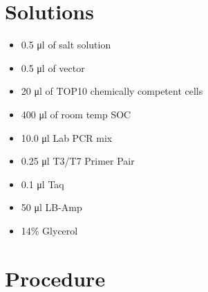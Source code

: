 \documentclass[
  letterpaper,
  DIV=11,
  numbers=noendperiod]{scrreprt}
\providecommand{\tightlist}{%
  \setlength{\itemsep}{0pt}\setlength{\parskip}{0pt}}\usepackage{longtable,booktabs,array}
\begin{document}
\hypertarget{solutions-21}{%
\section{Solutions}\label{solutions-21}}

\begin{itemize}
\tightlist
\item
  0.5 μl of salt solution
\item
  0.5 μl of vector
\item
  20 μl of TOP10 chemically competent cells
\item
  400 μl of room temp SOC
\item
  10.0 μl Lab PCR mix
\item
  0.25 μl T3/T7 Primer Pair
\item
  0.1 μl Taq
\item
  50 μl LB-Amp
\item
  14\% Glycerol
\end{itemize}

\hypertarget{procedure-25}{%
\section{Procedure}\label{procedure-25}}
\end{document}
